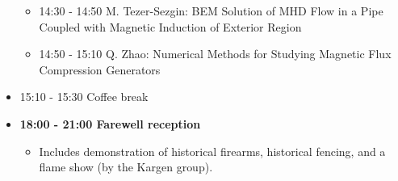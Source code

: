 \documentclass[10pt, A4]{article}%
\begin{document}
\begin{itemize}
\begin{itemize}
    \item 14:30 - 14:50 M. Tezer-Sezgin: BEM Solution of MHD Flow in a Pipe Coupled with Magnetic Induction of Exterior Region 
    \item 14:50 - 15:10 Q. Zhao: Numerical Methods for Studying Magnetic Flux Compression Generators 
  \end{itemize}
  \item 15:10 - 15:30 Coffee break
  \item {\bf 18:00 - 21:00 Farewell reception}
    \begin{itemize}
     \item Includes demonstration of historical firearms, historical fencing, and a flame show (by the Kargen group).  
  \end{itemize} 
\end{itemize}

\newpage
\end{document}
